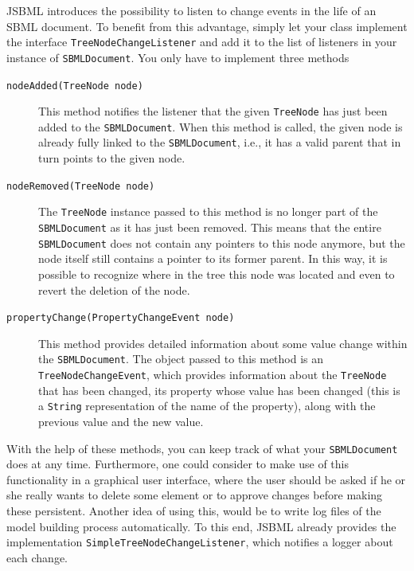 JSBML introduces the possibility to listen to change events in the life of an
SBML document. To benefit from this advantage, simply let your class implement
the interface
\texttt{TreeNodeChangeListener}
and add it to the list of listeners in your instance of
\texttt{SBMLDocument}. You only have to
implement three methods
\begin{description}
 \item[\texttt{nodeAdded(TreeNode node)}] This method notifies the listener
 that the given \texttt{TreeNode} has just
 been added to the \texttt{SBMLDocument}. When this method is called, the given
 node is already fully linked to the \texttt{SBMLDocument}, i.e., it has a valid
 parent that in turn points to the given node.
 \item[\texttt{nodeRemoved(TreeNode node)}] The \texttt{TreeNode} instance
 passed to this method is no longer part of the \texttt{SBMLDocument} as it has
 just been removed. This means that the entire \texttt{SBMLDocument} does not
 contain any pointers to this node anymore, but the node itself still contains a
 pointer to its former parent. In this way, it is possible to recognize where
 in the tree this node was located and even to revert the deletion of the node.
 \item[\texttt{propertyChange(PropertyChangeEvent node)}] This method provides
 detailed information about some value change within the \texttt{SBMLDocument}.
 The object passed to this method is an
 \texttt{TreeNodeChangeEvent}, which
 provides information about the
 \texttt{TreeNode} that has been changed, its
 property whose value has been changed (this is a
 \texttt{String} representation of the name of
 the property), along with the previous value and the new value.
\end{description}
With the help of these methods, you can keep track of what your
\texttt{SBMLDocument} does at any time.
Furthermore, one could consider to make use of this functionality in a graphical
user interface, where the user should be asked
if he or she really wants to delete some element or to approve changes before
making these persistent. Another idea of using this, would be to write log
files of the model building process
automatically. To this end, JSBML already provides the implementation
\texttt{SimpleTreeNodeChangeListener},
%
which notifies a logger about each change.

